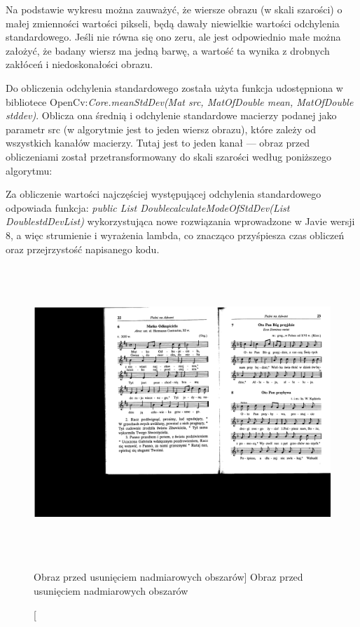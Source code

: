 \documentclass[a4paper,12pt]{article}
\begin{document}
    			Na podstawie wykresu można zauważyć, że wiersze obrazu (w skali szarości) o małej zmienności wartości pikseli, będą dawały niewielkie wartości odchylenia standardowego. Jeśli nie równa się ono zeru, ale jest odpowiednio małe można założyć, że badany wiersz ma jedną barwę, a wartość ta wynika z drobnych zakłóceń i niedoskonałości obrazu.
    			
    			Do obliczenia odchylenia standardowego została użyta funkcja udostępniona w bibliotece OpenCv:\textit {Core.meanStdDev(Mat src, MatOfDouble mean, MatOfDouble stddev)}. Oblicza ona średnią i odchylenie standardowe macierzy podanej jako parametr src (w algorytmie jest to jeden wiersz obrazu), które zależy od wszystkich kanałów macierzy. Tutaj jest to jeden kanał --- obraz przed obliczeniami został przetransformowany do skali szarości według poniższego algorytmu:
    			 		
			    		
    			 		
    			Za obliczenie wartości najczęściej występującej odchylenia standardowego odpowiada funkcja: \textit {public List \guilsinglleft Double\guilsinglright calculateModeOfStdDev(List \guilsinglleft Double\guilsinglright stdDevList)}
    			wykorzystująca nowe rozwiązania wprowadzone w Javie wersji 8, a więc strumienie i wyrażenia lambda, co znacząco przyśpiesza czas obliczeń oraz przejrzystość napisanego kodu. 
    			\newline
			
			    
			
    		    \begin{figure}[!ht]  
    			    \begin{center}
    				    \includegraphics[height=11cm, frame] {image//exampleImage//002_a.png} 
    			    \end{center}
    			    \caption
    			        [Obraz przed usunięciem nadmiarowych obszarów]
        			    {Obraz przed usunięciem nadmiarowych obszarów}  
    		    \end{figure}
    		    
\end{document}
